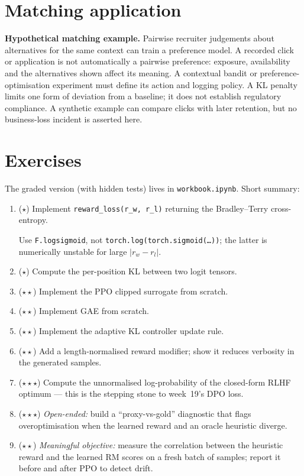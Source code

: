 \documentclass[11pt,oneside]{scrbook}
\begin{document}
\chapter{Matching application}

\begin{matching}
\textbf{Hypothetical matching example.} Pairwise recruiter judgements about
alternatives for the same context can train a preference model. A recorded
click or application is not automatically a pairwise preference: exposure,
availability and the alternatives shown affect its meaning. A contextual
bandit or preference-optimisation experiment must define its action and
logging policy. A KL penalty limits one form of deviation from a baseline;
it does not establish regulatory compliance. A synthetic example can compare
clicks with later retention, but no business-loss incident is asserted here.

\end{matching}

\chapter{Exercises}

The graded version (with hidden tests) lives in
\texttt{workbook.ipynb}. Short summary:

\begin{enumerate}[leftmargin=*]
  \item ($\star$) Implement \texttt{reward\_loss(r\_w, r\_l)} returning
        the Bradley--Terry cross-entropy.
        \begin{intuition} Use \texttt{F.logsigmoid}, not
        \texttt{torch.log(torch.sigmoid(\ldots))}; the latter is
        numerically unstable for large $|r_w - r_l|$.
        \end{intuition}
  \item ($\star$) Compute the per-position KL between two logit tensors.
  \item ($\star\star$) Implement the PPO clipped surrogate from scratch.
  \item ($\star\star$) Implement GAE from scratch.
  \item ($\star\star$) Implement the adaptive KL controller update rule.
  \item ($\star\star$) Add a length-normalised reward modifier; show it
        reduces verbosity in the generated samples.
  \item ($\star\star\star$) Compute the unnormalised log-probability of
        the closed-form RLHF optimum --- this is the stepping stone to
        week~19's DPO loss.
  \item ($\star\star\star$) \emph{Open-ended:} build a
        ``proxy-vs-gold'' diagnostic that flags overoptimisation when
        the learned reward and an oracle heuristic diverge.
  \item ($\star\star$) \emph{Meaningful objective:} measure the
        correlation between the heuristic reward and the learned RM
        scores on a fresh batch of samples; report it before and after
        PPO to detect drift.
\end{enumerate}
\end{document}

